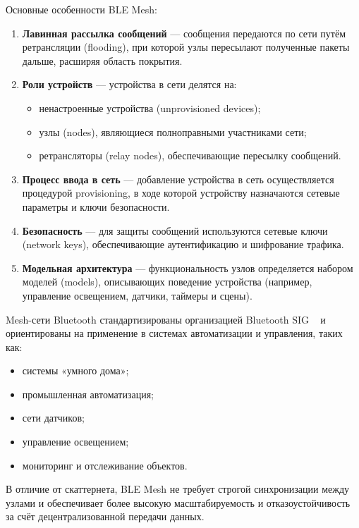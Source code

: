 Основные особенности BLE Mesh:
\begin{enumerate}[nosep]
    \item \textbf{Лавинная рассылка сообщений} --- сообщения передаются по сети путём ретрансляции (flooding), при которой узлы пересылают полученные пакеты дальше, расширяя область покрытия.

    \item \textbf{Роли устройств} --- устройства в сети делятся на:
    \begin{itemize}[nosep]
        \item ненастроенные устройства (unprovisioned devices);
        \item узлы (nodes), являющиеся полноправными участниками сети;
        \item ретрансляторы (relay nodes), обеспечивающие пересылку сообщений.
    \end{itemize}

    \item \textbf{Процесс ввода в сеть} --- добавление устройства в сеть осуществляется процедурой provisioning, в ходе которой устройству назначаются сетевые параметры и ключи безопасности.

    \item \textbf{Безопасность} --- для защиты сообщений используются сетевые ключи (network keys), обеспечивающие аутентификацию и шифрование трафика.

    \item \textbf{Модельная архитектура} --- функциональность узлов определяется набором моделей (models), описывающих поведение устройства (например, управление освещением, датчики, таймеры и сцены).
\end{enumerate}

Mesh-сети Bluetooth стандартизированы организацией Bluetooth SIG ~\cite{bluetooth_mesh_spec} и ориентированы на применение в системах автоматизации и управления, таких как:
\begin{itemize}[nosep]
    \item системы «умного дома»;
    \item промышленная автоматизация;
    \item сети датчиков;
    \item управление освещением;
    \item мониторинг и отслеживание объектов.
\end{itemize}

В отличие от скаттернета, BLE Mesh не требует строгой синхронизации между узлами и обеспечивает более высокую масштабируемость и отказоустойчивость за счёт децентрализованной передачи данных.


